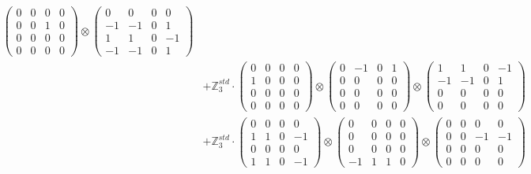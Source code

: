 \documentclass{article}
\begin{document}
{\begin{align}
            \begin{pmatrix} 0 & 0 & 0 & 0 \\ 0 & 0 & 1 & 0 \\ 0 & 0 & 0 & 0 \\ 0 & 0 & 0 & 0 \end{pmatrix} \otimes 
            \begin{pmatrix} 0 & 0 & 0 & 0 \\ -1 & -1 & 0 & 1 \\ 1 & 1 & 0 & -1 \\ -1 & -1 & 0 & 1 \end{pmatrix} \\ 
        &+ \label{Rs16-Rc11-Solution-14-c20} \mathbb{Z}_3^{std} \cdot 
            \begin{pmatrix} 0 & 0 & 0 & 0 \\ 1 & 0 & 0 & 0 \\ 0 & 0 & 0 & 0 \\ 0 & 0 & 0 & 0 \end{pmatrix} \otimes 
            \begin{pmatrix} 0 & -1 & 0 & 1 \\ 0 & 0 & 0 & 0 \\ 0 & 0 & 0 & 0 \\ 0 & 0 & 0 & 0 \end{pmatrix} \otimes 
            \begin{pmatrix} 1 & 1 & 0 & -1 \\ -1 & -1 & 0 & 1 \\ 0 & 0 & 0 & 0 \\ 0 & 0 & 0 & 0 \end{pmatrix} \\ 
        &+ \label{Rs16-Rc11-Solution-14-c21} \mathbb{Z}_3^{std} \cdot 
            \begin{pmatrix} 0 & 0 & 0 & 0 \\ 1 & 1 & 0 & -1 \\ 0 & 0 & 0 & 0 \\ 1 & 1 & 0 & -1 \end{pmatrix} \otimes 
            \begin{pmatrix} 0 & 0 & 0 & 0 \\ 0 & 0 & 0 & 0 \\ 0 & 0 & 0 & 0 \\ -1 & 1 & 1 & 0 \end{pmatrix} \otimes 
            \begin{pmatrix} 0 & 0 & 0 & 0 \\ 0 & 0 & -1 & -1 \\ 0 & 0 & 0 & 0 \\ 0 & 0 & 0 & 0 \end{pmatrix} \\ 

\end{align}}
\end{document}
